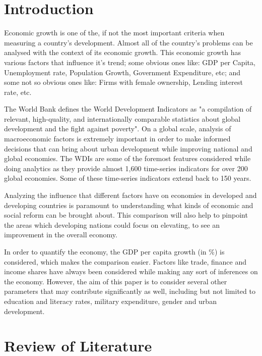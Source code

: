 \documentclass[conference]{IEEEtran}
\begin{document}
\section{Introduction}

Economic growth is one of the, if not the most important criteria when measuring a country’s development. Almost all of the country’s problems can be analysed with the context of its economic growth. This economic growth has various factors that influence it’s trend; some obvious ones like: GDP per Capita, Unemployment rate, Population Growth, Government Expenditure, etc; and some not so obvious ones like: Firms with female ownership, Lending interest rate, etc.

The World Bank defines the World Development Indicators as "a compilation of relevant, high-quality, and internationally comparable statistics about global development and the fight against poverty". On a global scale, analysis of macroeconomic factors is extremely important in order to make informed decisions that can bring about urban development while improving national and global economies. The WDIs are some of the foremost features considered while doing analytics as they provide almost 1,600 time-series indicators for over 200 global economies. Some of these time-series indicators extend back to 150 years. 

Analyzing the influence that different factors have on economies in developed and developing countries is paramount to understanding what kinds of economic and social reform can be brought about. This comparison will also help to pinpoint the areas which developing nations could focus on elevating, to see an improvement in the overall economy. 

In order to quantify the economy, the GDP per capita growth (in \%) is considered, which makes the comparison easier.  Factors like trade, finance and income shares have always been considered while making any sort of inferences on the economy. However, the aim of this paper is to consider several other parameters that may contribute significantly as well, including but not limited to education and literacy rates, military expenditure, gender and urban development.



\section{Review of Literature}
\end{document}
